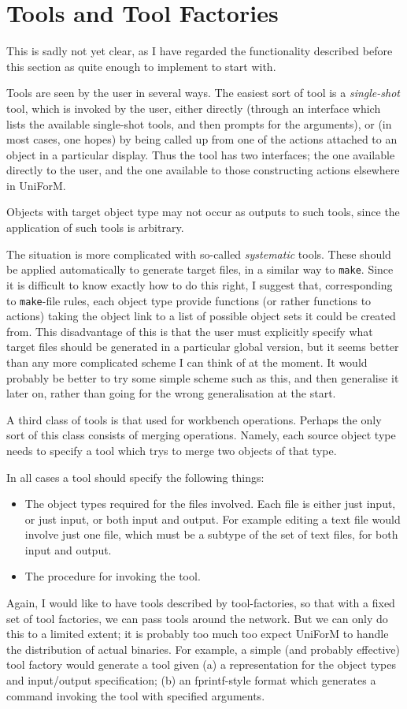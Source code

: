 \documentclass[a4paper]{article}
\begin{document}
\section{Tools and Tool Factories}
This is sadly not yet clear, as I have regarded the functionality described
before this section as quite enough to implement to start with.
\par
Tools are seen by the user in several ways.  The easiest sort of tool
is a {\em single-shot} tool, which is invoked by the user, either directly
(through an interface which lists the available single-shot tools,
and then prompts for the arguments), or (in most cases, one hopes) by being 
called up from one of the actions attached to an object in a particular 
display.  Thus the tool has two interfaces; the one available directly
to the user, and the one available to those constructing actions elsewhere
in UniForM. 
\par
Objects with target object type may not occur
as outputs to such tools, since the application of such tools is
arbitrary.
\par
The situation is more complicated with so-called {\em systematic}
tools.  These should be applied automatically to generate target
files, in a similar way to \texttt{make}.  Since it is difficult
to know exactly how to do this right, I suggest that, corresponding
to \texttt{make}-file rules, each object type provide functions
(or rather functions to actions) taking the object link to a list of
possible object sets it could be created from.  This disadvantage of
this is that the user must explicitly specify what target files should
be generated in a particular global version, but it seems better than
any more complicated scheme I can think of at the moment.  It would
probably be better to try some simple scheme such as this, and then
generalise it later on, rather than going for the wrong generalisation
at the start.
\par
A third class of tools is that used for workbench operations.
Perhaps the only sort of this class consists of merging operations.
Namely, each source object type needs to specify a tool which trys to
merge two objects of that type. 
\par
In all cases a tool should specify the following things:
\begin{itemize}
\item The object types required for the files involved.  Each file
      is either just input, or just input, or both input and output.
      For example editing a text file would involve just one file,
      which must be a subtype of the set of text files, for both
      input and output.
\item The procedure for invoking the tool.
\end{itemize}
Again, I would like to have tools described by tool-factories, so that
with a fixed set of tool factories, we can pass tools around the network.
But we can only do this to a limited extent; it is probably too much
too expect UniForM to handle the distribution of actual binaries.
For example, a simple (and probably effective) tool factory would
generate a tool given (a) a representation for the object types 
and input/output specification; (b) an fprintf-style format
which generates a command invoking the tool with specified arguments.
\end{document}
